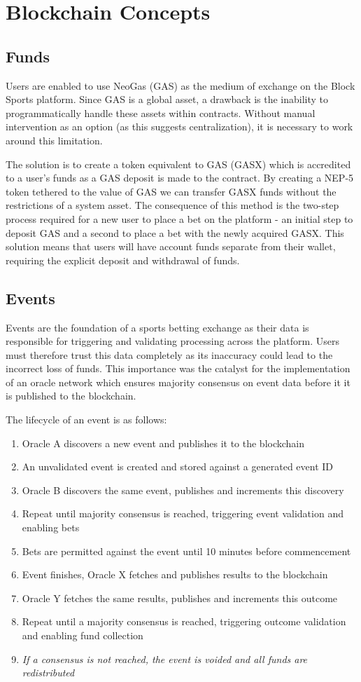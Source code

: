 \documentclass{article}
\begin{document}
\section{Blockchain Concepts}
	\subsection{Funds}
Users are enabled to use NeoGas (GAS) as the medium of exchange on the Block Sports platform. Since GAS is a global asset, a drawback is the inability to programmatically handle these assets within contracts. Without manual intervention as an option (as this suggests centralization), it is necessary to work around this limitation.

The solution is to create a token equivalent to GAS (GASX) which is accredited to a user’s funds as a GAS deposit is made to the contract. By creating a NEP-5 token tethered to the value of GAS we can transfer GASX funds without the restrictions of a system asset. The consequence of this method is the two-step process required for a new user to place a bet on the platform - an initial step to deposit GAS and a second to place a bet with the newly acquired GASX. This solution means that users will have account funds separate from their wallet, requiring the explicit deposit and withdrawal of funds.


	\subsection{Events}
Events are the foundation of a sports betting exchange as their data is responsible for triggering and validating processing across the platform. Users must therefore trust this data completely as its inaccuracy could lead to the incorrect loss of funds. This importance was the catalyst for the implementation of an oracle network which ensures majority consensus on event data before it it is published to the blockchain.

The lifecycle of an event is as follows:
\begin{enumerate}
	\item Oracle A discovers a new event and publishes it to the blockchain
	\item An unvalidated event is created and stored against a generated event ID
	\item Oracle B discovers the same event, publishes and increments this discovery
	\item Repeat until majority consensus is reached, triggering event validation and enabling bets
	\item Bets are permitted against the event until 10 minutes before commencement
	\item Event finishes, Oracle X fetches and publishes results to the blockchain
	\item Oracle Y fetches the same results, publishes and increments this outcome
	\item Repeat until a majority consensus is reached, triggering outcome validation and enabling fund collection
	\item \it{If a consensus is not reached, the event is voided and all funds are redistributed}
\end{enumerate}
\end{document}
